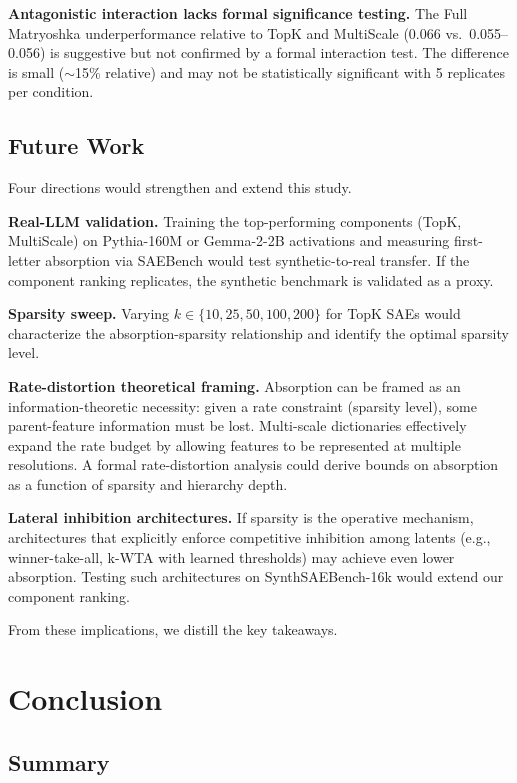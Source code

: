 \documentclass{article}
\begin{document}
\textbf{Antagonistic interaction lacks formal significance testing.} The Full Matryoshka underperformance relative to TopK and MultiScale (0.066 vs.~0.055--0.056) is suggestive but not confirmed by a formal interaction test. The difference is small ($\sim$15\% relative) and may not be statistically significant with 5 replicates per condition.

\subsection{Future Work}

Four directions would strengthen and extend this study.

\textbf{Real-LLM validation.} Training the top-performing components (TopK, MultiScale) on Pythia-160M or Gemma-2-2B activations and measuring first-letter absorption via SAEBench would test synthetic-to-real transfer. If the component ranking replicates, the synthetic benchmark is validated as a proxy.

\textbf{Sparsity sweep.} Varying $k \in \{10, 25, 50, 100, 200\}$ for TopK SAEs would characterize the absorption-sparsity relationship and identify the optimal sparsity level.

\textbf{Rate-distortion theoretical framing.} Absorption can be framed as an information-theoretic necessity: given a rate constraint (sparsity level), some parent-feature information must be lost. Multi-scale dictionaries effectively expand the rate budget by allowing features to be represented at multiple resolutions. A formal rate-distortion analysis could derive bounds on absorption as a function of sparsity and hierarchy depth.

\textbf{Lateral inhibition architectures.} If sparsity is the operative mechanism, architectures that explicitly enforce competitive inhibition among latents (e.g., winner-take-all, k-WTA with learned thresholds) may achieve even lower absorption. Testing such architectures on SynthSAEBench-16k would extend our component ranking.

From these implications, we distill the key takeaways.

\section{Conclusion}

\subsection{Summary}
\end{document}
